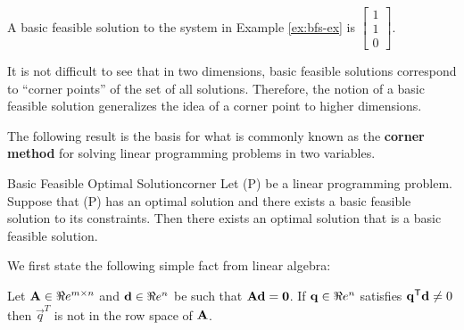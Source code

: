 A basic feasible solution to the system in Example \ref{ex:bfs-ex} is
\(\begin{bmatrix} 1 \\ 1\\ 0\end{bmatrix}.\)

It is not difficult to see that in two dimensions, basic feasible
solutions correspond to ``corner points'' of the set of all solutions.
Therefore, the notion of a basic feasible solution generalizes the idea
of a corner point to higher dimensions.

The following result is the basis for what is commonly known as the
\textbf{corner method} for solving linear programming problems in two
variables.

\begin{theorem}{Basic Feasible Optimal Solution}{corner}
\protect\hypertarget{thm:corner}{}{\label{thm:corner}}Let (P) be a linear
programming problem. Suppose that (P) has an optimal solution and there
exists a basic feasible solution to its constraints. Then there exists
an optimal solution that is a basic feasible solution.
\end{theorem}

We first state the following simple fact from linear algebra:

\begin{lemma}{}{}
\protect\hypertarget{lem:orth-rank}{}{\label{lem:orth-rank}}Let
\(\mathbf{A} \in \Re e^{m\times n}\) and \(\mathbf{d} \in \Re e^n\) be such that
\(\mathbf{A} \mathbf{d} = \mathbf{0}\). If \(\mathbf{q}\in\Re e^n\) satisfies
\(\mathbf{q}^{\mathsf{T}} \mathbf{d} \neq 0\) then \(\vec{q}^T\) is not in the row space
of \(\mathbf{A}\).
\end{lemma}

